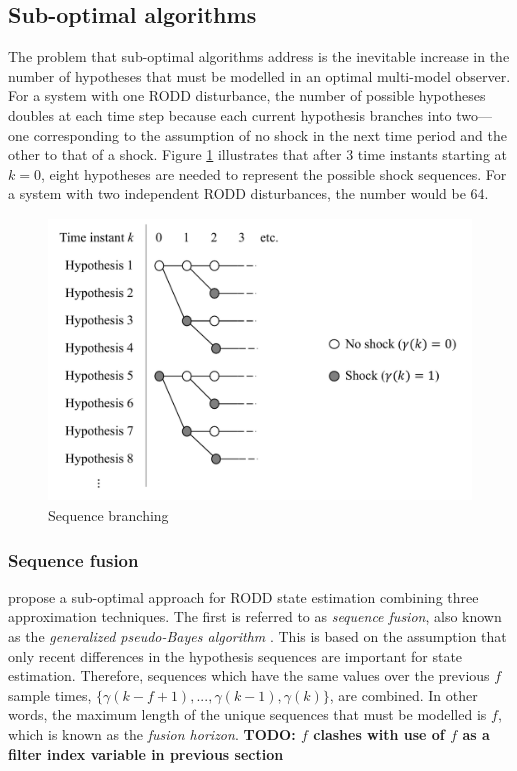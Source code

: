 \subsection{Sub-optimal algorithms}

The problem that sub-optimal algorithms address is the inevitable increase in the number of hypotheses that must be modelled in an optimal multi-model observer. For a system with one RODD disturbance, the number of possible hypotheses doubles at each time step because each current hypothesis branches into two—one corresponding to the assumption of no shock in the next time period and the other to that of a shock. Figure \ref{fig:mm-obs-br} illustrates that after 3 time instants starting at $k=0$, eight hypotheses are needed to represent the possible shock sequences. For a system with two independent RODD disturbances, the number would be 64.

\begin{figure}[htp]
	\centering
	\includegraphics[height=7.5cm]{images/mm_obs_seq_br.pdf}
	\caption{Sequence branching}
	\label{fig:mm-obs-br}
\end{figure}


\subsubsection{Sequence fusion} \label{subsec-fusion}

\cite{robertson_detection_1995} propose a sub-optimal approach for RODD state estimation combining three approximation techniques. The first is referred to as \textit{sequence fusion}, also known as the \textit{generalized pseudo-Bayes algorithm} \citep{buxbaum_recursive_1969, jaffer_estimation_1971, tugnait_detection_1982}. This is based on the assumption that only recent differences in the hypothesis sequences are important for state estimation. Therefore, sequences which have the same values over the previous $f$ sample times, $\{\gamma(k-f+1), ...,  \gamma(k-1), \gamma(k)\}$, are combined. In other words, the maximum length of the unique sequences that must be modelled is $f$, which is known as the \textit{fusion horizon}. \textbf{TODO: $f$ clashes with use of $f$ as a filter index variable in previous section}

